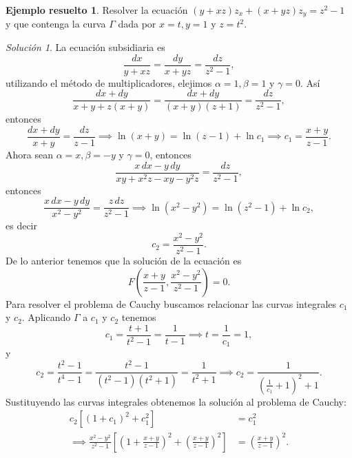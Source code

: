 \documentclass[11pt,letterpaper,draft]{report}
\theoremstyle{plain}
\theoremstyle{definition}
\newtheorem{solved}[theorem]{Ejemplo resuelto}
\theoremstyle{remark}
\newtheorem*{solution}{Solución}
\newcommand\<{\langle}
\renewcommand\>{\rangle}
\begin{document}
\begin{solved}
  Resolver la ecuación $(y+xz) z_x + (x+yz) z_y = z^2 - 1$ y
  que contenga la curva $\Gamma$ dada por $x = t, y = 1$ y
  $z = t^2$.
  \begin{solution}
    La ecuación subsidiaria es
    \[
    \frac{dx}{y+xz} = \frac{dy}{x+yz} = \frac{dz}{z^2-1},
    \] 
    utilizando el método de multiplicadores, elejimos
    $\alpha = 1, \beta = 1$ y $\gamma = 0$. Así
    \[
      \frac{dx+dy}{x+y+z(x+y)} = \frac{dx+dy}{(x+y)(z+1)} =
      \frac{dz}{z^2-1},
    \] 
    entonces
    \[
    \frac{dx+dy}{x+y} = \frac{dz}{z-1} \implies \ln(x+y) =
    \ln(z-1) + \ln c_1 \implies c_1 = \frac{x+y}{z-1}.
    \] 
    Ahora sean $\alpha = x, \beta = -y$ y $\gamma = 0$,
    entonces
    \[
    \frac{x \, dx - y \, dy}{xy + x^2z - xy - y^2z} =
    \frac{dz}{z^2-1},
    \] 
    entonces
    \[
    \frac{x \, dx - y \, dy}{x^2-y^2} = \frac{z \,
    dz}{z^2-1} \implies \ln(x^2-y^2) = \ln(z^2-1) + \ln c_2,
    \] 
    es decir
    \[
    c_2 = \frac{x^2-y^2}{z^2-1}.
    \] 
    De lo anterior tenemos que la solución de la ecuación es
    \[
    F\left(\frac{x+y}{z-1}, \frac{x^2-y^2}{z^2-1}\right) =
    0.
    \]
    Para resolver el problema de Cauchy buscamos relacionar
    las curvas integrales $c_1$ y $c_2$. Aplicando $\Gamma$ 
    a $c_1$ y $c_2$ tenemos
    \[
    c_1 = \frac{t+1}{t^2-1} = \frac{1}{t-1} \implies t =
    \frac{1}{c_1} = 1,
    \] 
    y
    \[
    c_2 = \frac{t^2-1}{t^4 - 1} =
    \frac{t^2-1}{(t^2-1)(t^2+1)} = \frac{1}{t^2+1} \implies
    c_2 = \frac{1}{\left(\frac{1}{c_1}+1\right)^2+1}.
    \] 
    Sustituyendo las curvas integrales obtenemos la solución
    al problema de Cauchy:
    \begin{align*}
      c_2 \left[(1+c_1)^2 + c_1^2\right] &= c_1^2\\
      \implies
      \frac{x^2-y^2}{z^2-1}\left[\left(1+\frac{x+y}{z-1}\right)^2
    + \left(\frac{x+y}{z-1}\right)^2 \right] &=
        \left(\frac{x+y}{z-1}\right)^2.
    \end{align*}
  \end{solution}
\end{solved}
\end{document}

